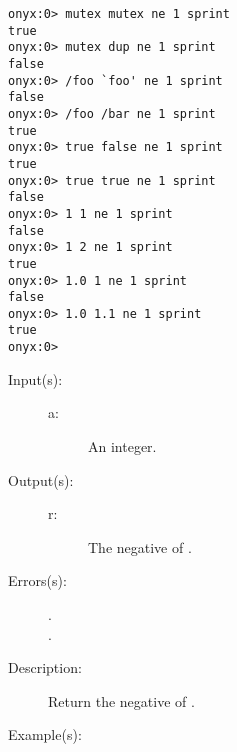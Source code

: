 \begin{description}
\begin{description}
\begin{verbatim}
onyx:0> mutex mutex ne 1 sprint
true
onyx:0> mutex dup ne 1 sprint
false
onyx:0> /foo `foo' ne 1 sprint
false
onyx:0> /foo /bar ne 1 sprint
true
onyx:0> true false ne 1 sprint
true
onyx:0> true true ne 1 sprint
false
onyx:0> 1 1 ne 1 sprint
false
onyx:0> 1 2 ne 1 sprint
true
onyx:0> 1.0 1 ne 1 sprint
false
onyx:0> 1.0 1.1 ne 1 sprint
true
onyx:0>
		\end{verbatim}
	\end{description}
\label{systemdict:neg}
\item[{\onyxop{a}{neg}{r}}: ]
	\begin{description}\item[]
	\item[Input(s): ]
		\begin{description}\item[]
		\item[a: ]
			An integer.
		\end{description}
	\item[Output(s): ]
		\begin{description}\item[]
		\item[r: ]
			The negative of .
		\end{description}
	\item[Errors(s): ]
		\begin{description}\item[]
		\item[.]
		\item[.]
		\end{description}
	\item[Description: ]
		Return the negative of .
	\item[Example(s): ]\begin{verbatim}


\end{verbatim}
\end{description}
\end{description}
